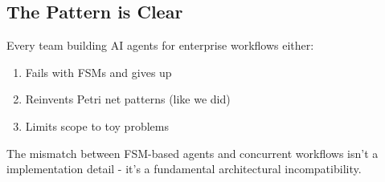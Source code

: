 \documentclass[11pt,a4paper]{article}
\begin{document}
\subsection{The Pattern is Clear}

Every team building AI agents for enterprise workflows either:
\begin{enumerate}
\item Fails with FSMs and gives up
\item Reinvents Petri net patterns (like we did)
\item Limits scope to toy problems
\end{enumerate}

The mismatch between FSM-based agents and concurrent workflows isn't a implementation detail - it's a fundamental architectural incompatibility.
\end{document}
